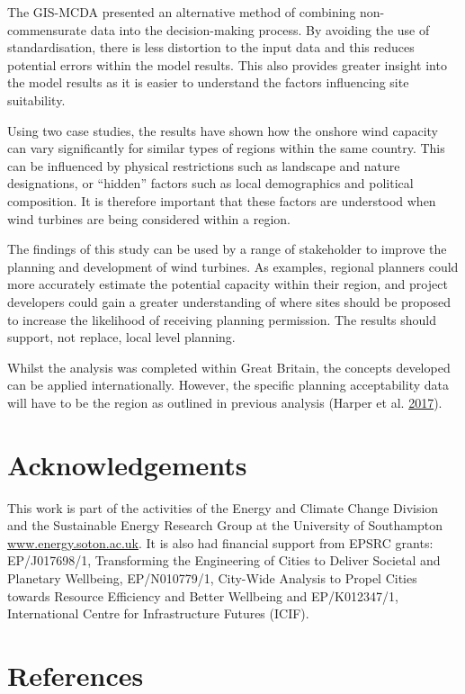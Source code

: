\documentclass[a4paper,]{article}
\theoremstyle{definition}
\theoremstyle{definition}
\theoremstyle{remark}
\begin{document}
{The GIS-MCDA presented an alternative method of combining
non-commensurate data into the decision-making process. By avoiding the
use of standardisation, there is less distortion to the input data and
this reduces potential errors within the model results. This also
provides greater insight into the model results as it is easier to
understand the factors influencing site suitability.

Using two case studies, the results have shown how the onshore wind
capacity can vary significantly for similar types of regions within the
same country. This can be influenced by physical restrictions such as
landscape and nature designations, or ``hidden'' factors such as local
demographics and political composition. It is therefore important that
these factors are understood when wind turbines are being considered
within a region.

The findings of this study can be used by a range of stakeholder to
improve the planning and development of wind turbines. As examples,
regional planners could more accurately estimate the potential capacity
within their region, and project developers could gain a greater
understanding of where sites should be proposed to increase the
likelihood of receiving planning permission. The results should support,
not replace, local level planning.

Whilst the analysis was completed within Great Britain, the concepts
developed can be applied internationally. However, the specific planning
acceptability data will have to be the region as outlined in previous
analysis (Harper et al. \protect\hyperlink{ref-Harper2017}{2017}).

\section*{Acknowledgements}\label{acknowledgements}

This work is part of the activities of the Energy and Climate Change
Division and the Sustainable Energy Research Group at the University of
Southampton \url{www.energy.soton.ac.uk}. It is also had financial
support from EPSRC grants: EP/J017698/1, Transforming the Engineering of
Cities to Deliver Societal and Planetary Wellbeing, EP/N010779/1,
City-Wide Analysis to Propel Cities towards Resource Efficiency and
Better Wellbeing and EP/K012347/1, International Centre for
Infrastructure Futures (ICIF).

\section*{References}\label{references}

}
\end{document}
